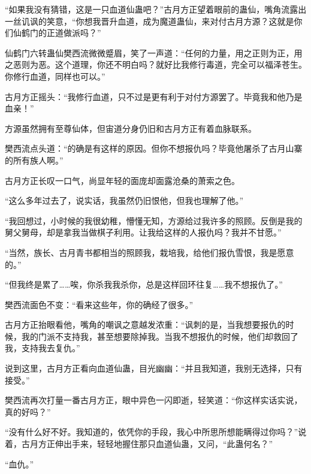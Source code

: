 \begin{this_body}
“如果我没有猜错，这是一只血道仙蛊吧？”古月方正望着眼前的蛊仙，嘴角流露出一丝讥讽的笑意，“你想我晋升血道，成为魔道蛊仙，来对付古月方源？这就是你们仙鹤门的正道做派吗？”

仙鹤门六转蛊仙樊西流微微蹙眉，笑了一声道：“任何的力量，用之正则为正，用之恶则为恶。这个道理，你还不明白吗？就好比我修行毒道，完全可以福泽苍生。你修行血道，同样也可以。”

古月方正摇头：“我修行血道，只不过是更有利于对付方源罢了。毕竟我和他乃是血亲！”

方源虽然拥有至尊仙体，但宙道分身仍旧和古月方正有着血脉联系。

樊西流点头道：“的确是有这样的原因。但你不想报仇吗？毕竟他屠杀了古月山寨的所有族人啊。”

古月方正长叹一口气，尚显年轻的面庞却面露沧桑的萧索之色。

“这么多年过去了，说实话，我虽然仍旧恨他，但我也理解了他。”

“我回想过，小时候的我很幼稚，懵懂无知，方源给过我许多的照顾。反倒是我的舅父舅母，却是拿我当做棋子利用。让我给这样的人报仇吗？我并不甘愿。”

“当然，族长、古月青书都相当的照顾我，栽培我，给他们报仇雪恨，我是愿意的。”

“但我终是累了……唉，你杀我我杀你，总是这样回环往复……我不想报仇了。”

樊西流面色不变：“看来这些年，你的确经了很多。”

古月方正抬眼看他，嘴角的嘲讽之意越发浓重：“讽刺的是，当我想要报仇的时候，我的门派不支持我，甚至想要除掉我。当我不想报仇的时候，他们却救回了我，支持我去复仇。”

说到这里，古月方正看向血道仙蛊，目光幽幽：“并且我知道，我别无选择，只有接受。”

樊西流再次打量一番古月方正，眼中异色一闪即逝，轻笑道：“你这样实话实说，真的好吗？”

“没有什么好不好。我知道的，依凭你的手段，我心中所思所想能瞒得过你吗？”说着，古月方正伸出手来，轻轻地握住那只血道仙蛊，又问，“此蛊何名？”

“血仇。”

\end{this_body}

